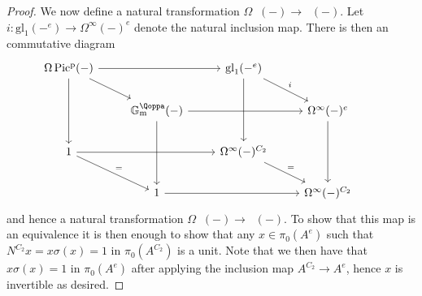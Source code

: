 \documentclass{article}
\DeclareMathOperator{\Picp}{Pic^p} %
\DeclareMathOperator{\gmq}{\mathbb{G}_m^\Qoppa}
\theoremstyle{definition}
\newcommand{\Lucy}[1]{\todo[color=cyan!30]{\linespread{1}\footnotesize L: #1}}
\begin{document}
\begin{proof}
    We now define a natural transformation $\Omega \Picp(-)\to \gmq(-)$. Let $i:\mathrm{gl}_1(-^e)\to \Omega^\infty (-)^e$ denote the natural inclusion map. There is then an commutative diagram
    \[
    \begin{tikzcd}
        \Omega \Picp(-) \ar[rr] \ar[dd] \ar[rd] & & \mathrm{gl}_1(-^e) \ar[dd] \ar[rd, "i"] & &  \\
         & \gmq(-) \ar[rr] \ar[dd] & & \Omega^{\infty}(-)^e  \ar[dd] & \\
         1 \ar[rd,"="] \ar[rr]  & & \Omega^\infty (-)^{C_2} \ar[rd, "="] &  \\
         & 1 \ar[rr] & & \Omega^\infty (-)^{C_2} 
    \end{tikzcd}
    \] and hence a natural transformation $\Omega \Picp(-)\to \gmq(-)$. To show that this map is an equivalence it is then enough to show that any $x\in \pi_0(A^e)$ such that $N^{C_2}x=x\sigma(x)=1$ in $\pi_0(A^{C_2})$ is a unit. Note that we then have that $x\sigma(x)=1$ in $\pi_0(A^e)$ after applying the inclusion map $A^{C_2}\to A^e$, hence $x$ is invertible as desired. 

\end{proof}
\end{document}
